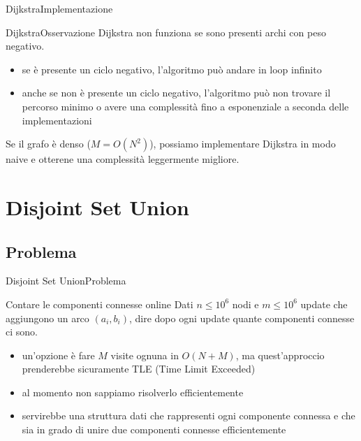\documentclass[compress]{beamer}
\begin{document}
\begin{frame}{Dijkstra}{Implementazione}
\end{frame}


\begin{frame}{Dijkstra}{Osservazione}
    Dijkstra non funziona se sono presenti archi con peso negativo.
    \pause 
    \begin{itemize}
        \item se è presente un ciclo negativo, l'algoritmo può andare in loop infinito
        \pause
        \item anche se non è presente un ciclo negativo, l'algoritmo può non trovare il percorso minimo o 
        avere una complessità fino a esponenziale a seconda delle implementazioni
    \end{itemize}
    \pause
    Se il grafo è denso ($M = O(N^2)$), possiamo implementare Dijkstra in modo naive e otterene una complessit\`a leggermente migliore.
\end{frame}

\section{Disjoint Set Union}
\subsection{Problema}
\begin{frame}{Disjoint Set Union}{Problema}
    \begin{exampleblock}{Contare le componenti connesse online}
        Dati $n \leq 10^6$ nodi e $m \leq 10^6$ update che aggiungono un arco $(a_i, b_i)$, dire dopo ogni update quante componenti connesse ci sono.
    \end{exampleblock}
    \pause
    \begin{itemize}
        \item un'opzione \`e fare $M$ visite ognuna in $O(N + M)$, ma quest'approccio prenderebbe sicuramente TLE (Time Limit Exceeded)
        \pause
        \item al momento non sappiamo risolverlo efficientemente
        \pause
        \item servirebbe una struttura dati che rappresenti ogni componente connessa e che sia in grado di unire due componenti connesse efficientemente
    \end{itemize}
\end{frame}
\end{document}
